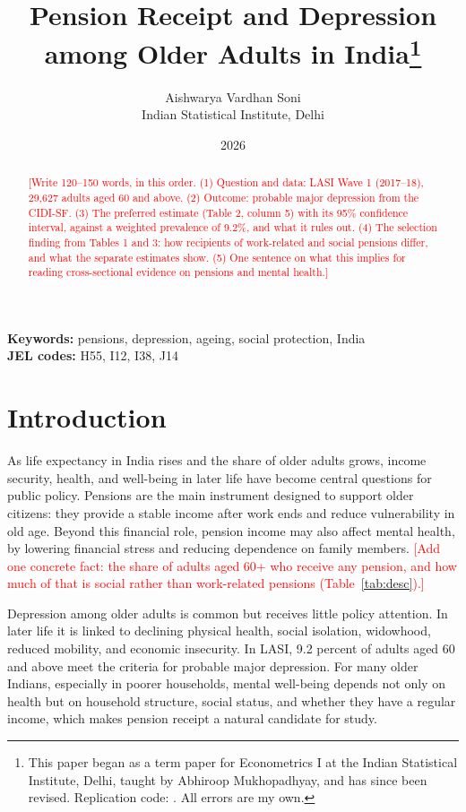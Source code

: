 \documentclass[11pt]{article}
\title{Pension Receipt and Depression among Older Adults in India\thanks{This
paper began as a term paper for Econometrics I at the Indian Statistical
Institute, Delhi, taught by Abhiroop Mukhopadhyay, and has since been revised.
Replication code: \todo{GitHub link}. \todo{Acknowledgments, if any.} All
errors are my own.}}
\author{Aishwarya Vardhan Soni\\ Indian Statistical Institute, Delhi}
\date{\todo{Month} 2026}
\newcommand{\todo}[1]{\textcolor{red}{[#1]}}
\begin{document}
\maketitle

\begin{abstract}
\noindent\todo{Write 120--150 words, in this order. (1) Question and data:
LASI Wave 1 (2017--18), 29,627 adults aged 60 and above. (2) Outcome: probable
major depression from the CIDI-SF. (3) The preferred estimate (Table 2,
column 5) with its 95\% confidence interval, against a weighted prevalence of
9.2\%, and what it rules out. (4) The selection finding from Tables 1 and 3:
how recipients of work-related and social pensions differ, and what the
separate estimates show. (5) One sentence on what this implies for reading
cross-sectional evidence on pensions and mental health.}
\end{abstract}

\medskip
\noindent\textbf{Keywords:} pensions, depression, ageing, social protection, India\\
\noindent\textbf{JEL codes:} H55, I12, I38, J14

\newpage

\section{Introduction}

As life expectancy in India rises and the share of older adults grows, income
security, health, and well-being in later life have become central questions
for public policy. Pensions are the main instrument designed to support older
citizens: they provide a stable income after work ends and reduce
vulnerability in old age. Beyond this financial role, pension income may also
affect mental health, by lowering financial stress and reducing dependence on
family members. \todo{Add one concrete fact: the share of adults aged 60+ who
receive any pension, and how much of that is social rather than work-related
pensions (Table~\ref{tab:desc}).}

Depression among older adults is common but receives little policy attention.
In later life it is linked to declining physical health, social isolation,
widowhood, reduced mobility, and economic insecurity. In LASI, 9.2 percent of
adults aged 60 and above meet the criteria for probable major depression. For
many older Indians, especially in poorer households, mental well-being depends
not only on health but on household structure, social status, and whether they
have a regular income, which makes pension receipt a natural candidate for
study.
\end{document}
